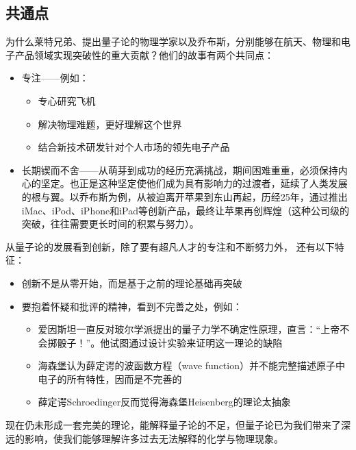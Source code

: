 \hypertarget{ux5171ux901aux70b9}{%
\subsection{共通点}\label{ux5171ux901aux70b9}}

为什么莱特兄弟、提出量子论的物理学家以及乔布斯，分别能够在航天、物理和电子产品领域实现突破性的重大贡献？他们的故事有两个共同点：

\begin{itemize}
\tightlist
\item
  专注------例如：

  \begin{itemize}
  \tightlist
  \item
    专心研究飞机
  \item
    解决物理难题，更好理解这个世界
  \item
    结合新技术研发针对个人市场的领先电子产品
  \end{itemize}
\item
  长期锲而不舍------从萌芽到成功的经历充满挑战，期间困难重重，必须保持内心的坚定。也正是这种坚定使他们成为具有影响力的过渡者，延续了人类发展的根与翼。以乔布斯为例，从被迫离开苹果到东山再起，历经25年，通过推出iMac、iPod、iPhone和iPad等创新产品，最终让苹果再创辉煌（这种公司级的突破，往往需要更长时间的积累与努力）。
\end{itemize}

从量子论的发展看到创新，除了要有超凡人才的专注和不断努力外，
还有以下特征：

\begin{itemize}
\tightlist
\item
  创新不是从零开始，而是基于之前的理论基础再突破
\item
  要抱着怀疑和批评的精神，看到不完善之处，例如：

  \begin{itemize}
  \tightlist
  \item
    爱因斯坦一直反对玻尔学派提出的量子力学不确定性原理，直言：``上帝不会掷骰子！''。他试图通过设计实验来证明这一理论的缺陷
  \item
    海森堡认为薛定谔的波函数方程（wave
    function）并不能完整描述原子中电子的所有特性，因而是不完善的
  \item
    薛定谔Schroedinger反而觉得海森堡Heisenberg的理论太抽象
  \end{itemize}
\end{itemize}

现在仍未形成一套完美的理论，能解释量子论的不足，但量子论已为我们带来了深远的影响，使我们能够理解许多过去无法解释的化学与物理现象。\\

